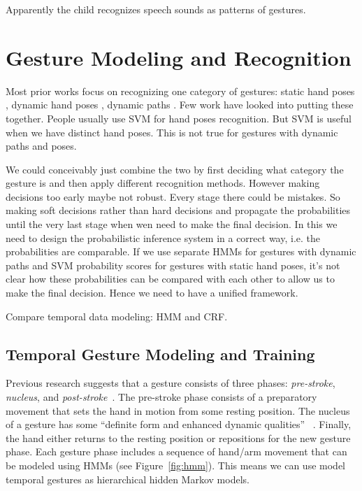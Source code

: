 \begin{savequote}
Apparently the child recognizes speech sounds as patterns of gestures.
\end{savequote}
\chapter{Gesture Modeling and Recognition}

Most prior works focus on recognizing one category of gestures: static hand
poses \cite{hu2013}, dynamic hand poses \cite{suryanarayan2010}, dynamic paths
\cite{song12}. Few work have looked into putting these together. People usually
use SVM for hand poses recognition. But SVM is useful when we have distinct hand
poses. This is not true for gestures with dynamic paths and poses.

We could conceivably just combine the two by first deciding what category the
gesture is and then apply different recognition methods. However making
decisions too early maybe not robust. Every stage there could be mistakes. So
making soft decisions rather than hard decisions and propagate the probabilities
until the very last stage when wen need to make the final decision. In this we
need to design the probabilistic inference system in a correct way, i.e. the
probabilities are comparable. If we use separate HMMs for gestures with dynamic
paths and SVM probability scores for gestures with static hand poses, it's not
clear how these probabilities can be compared with each other to allow us to
make the final decision. Hence we need to have a unified framework. 

Compare temporal data modeling: HMM and CRF. 

\section{Temporal Gesture Modeling and Training}

Previous research suggests that
a gesture consists of three phases: \textit{pre-stroke}, \textit{nucleus}, and \textit{post-stroke}~\cite{Pavlovic97}. The pre-stroke phase consists
of a preparatory movement that sets the hand in motion from some resting position.
The nucleus of a gesture has some ``definite form and enhanced dynamic qualities''
~\cite{kendon86}. Finally, the hand either returns to the resting position or repositions
for the new gesture phase. Each gesture
phase includes a sequence of hand/arm movement that can be modeled using HMMs (see Figure~\ref{fig:hmm}). 
This means we can use model temporal gestures as hierarchical hidden Markov
models.

